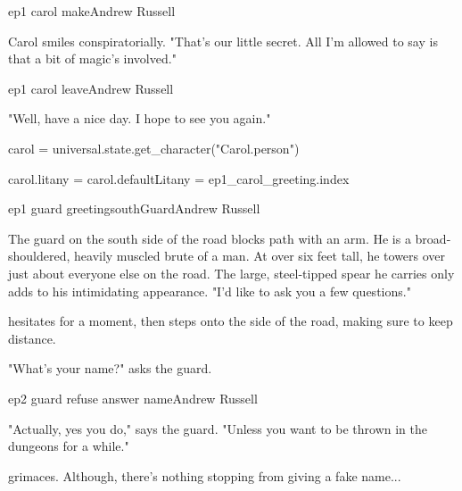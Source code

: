 \documentclass{book}
\begin{document}
\begin{childnode}{ep1 carol make}{Andrew Russell}

    Carol smiles conspiratorially. "That's our little secret. All I'm allowed to say is that a bit of magic's involved."



\end{childnode}

\begin{childnode}{ep1 carol leave}{Andrew Russell}

    "Well, have a nice day. I hope to see you again."

    \begin{code}

        carol = universal.state.get_character("Carol.person")

        carol.litany = carol.defaultLitany = ep1_carol_greeting.index

    \end{code}

\end{childnode}

\begin{node}{ep1 guard greeting}{southGuard}{Andrew Russell}

The guard on the south side of the road blocks \names{} path with an arm. 
    He is a broad-shouldered, heavily muscled brute of a man. At over six feet tall, he towers over just about everyone else on the road. The large, steel-tipped
    spear he carries only adds to his intimidating appearance. "I'd like to ask you a few questions."

\name{} hesitates for a moment, then steps onto the side of the road, making sure to keep \hisher{} distance. 

"What's your name?" asks the guard.




\end{node}

\begin{childnode}{ep2 guard refuse answer name}{Andrew Russell}

"Actually, yes you do," says the guard. "Unless you want to be thrown in the dungeons for a while."

\name{} grimaces. Although, there's nothing stopping \himher{} from giving a fake name...



\end{childnode}
\end{document}
